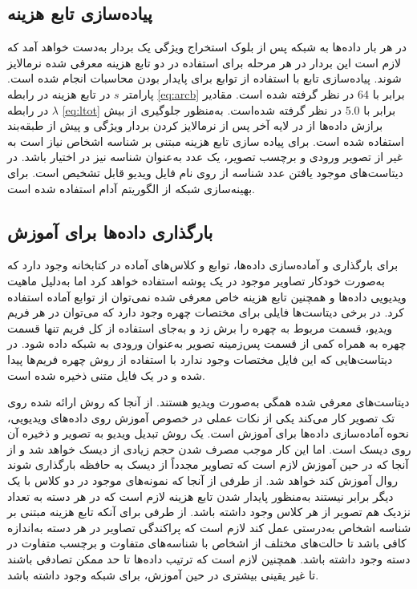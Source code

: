 \subsection{پیاده‌سازی تابع هزینه}
در هر بار  داده‌ها به شبکه پس از بلوک استخراج ویژگی یک بردار به‌دست خواهد آمد که لازم است این بردار در هر مرحله برای استفاده در دو تابع هزینه معرفی شده نرمالایز شوند. پیاده‌سازی تابع  با استفاده از توابع  برای پایدار بودن محاسبات انجام شده است. پارامتر 
$s$
در تابع هزینه
در رابطه 
\ref{eq:arcb}
برابر با 64 در نظر گرفته شده است. مقادیر 
$\lambda$
 در رابطه 
\ref{eq:ltot}
  برابر با 
5.0
 در نظر گرفته شده‌است.
 به‌منظور جلوگیری از بیش برازش داده‌ها از 
\cite{srivastava2014dropout}
در لایه آخر پس از نرمالایز کردن بردار ویژگی و پیش از طبقه‌بند استفاده شده است. 
برای پیاده سازی تابع هزینه مبتنی بر شناسه اشخاص نیاز است به غیر از تصویر ورودی و برچسب تصویر، یک عدد به‌عنوان شناسه نیز در اختیار باشد. در دیتاست‌های موجود یافتن عدد شناسه از روی نام فایل ویدیو قابل تشخیص است. برای بهینه‌سازی شبکه از الگوریتم آدام 
\cite{kingma2014adam}
استفاده شده است.
\subsection{بارگذاری داده‌ها برای آموزش}
برای بارگذاری و آماده‌سازی داده‌ها، توابع و کلاس‌های آماده در کتابخانه  وجود دارد که به‌صورت خودکار تصاویر موجود در یک پوشه استفاده خواهد کرد اما به‌دلیل ماهیت ویدیویی داده‌ها و همچنین تابع هزینه خاص معرفی شده نمی‌توان از توابع آماده استفاده کرد.
در برخی دیتاست‌ها فایلی برای مختصات چهره وجود دارد که می‌توان در هر فریم ویدیو، قسمت مربوط به چهره را برش زد و به‌جای استفاده از کل فریم تنها قسمت چهره به همراه کمی از قسمت پس‌زمینه تصویر به‌عنوان ورودی به شبکه داده شود. در دیتاست‌هایی که این فایل مختصات وجود ندارد با استفاده از روش 
\cite{zhang2016joint}
 چهره فریم‌ها پیدا شده و در یک فایل متنی ذخیره شده است.
 
دیتاست‌های معرفی شده همگی به‌صورت ویدیو هستند. از آنجا که روش ارائه شده روی تک تصویر کار می‌کند یکی از نکات عملی در خصوص آموزش روی داده‌های ویدیویی، نحوه آماده‌سازی داده‌ها برای آموزش است. یک روش تبدیل ویدیو به تصویر و ذخیره آن روی دیسک است. اما این کار موجب مصرف شدن حجم زیادی از دیسک خواهد شد و از آنجا که در حین آموزش لازم است که تصاویر مجدداً از دیسک به حافظه  بارگذاری شوند روال آموزش کند خواهد شد.
از طرفی از آنجا که نمونه‌های موجود در دو کلاس با یک دیگر برابر نیستند به‌منظور پایدار شدن تابع هزینه  لازم است که در هر دسته به تعداد نزدیک هم تصویر از هر کلاس وجود داشته باشد. از طرفی برای آنکه تابع هزینه مبتنی بر شناسه اشخاص به‌درستی عمل کند لازم است که پراکندگی تصاویر در هر دسته به‌اندازه کافی باشد تا حالت‌های مختلف از اشخاص با شناسه‌های متفاوت و برچسب متفاوت در دسته وجود داشته باشد. همچنین لازم است که ترتیب داده‌ها تا حد ممکن تصادفی باشند تا غیر یقینی بیشتری در حین آموزش، برای شبکه وجود داشته باشد. 

